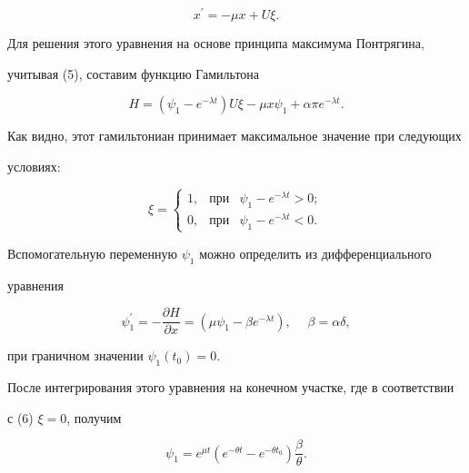 \[

x^\prime=-\mu x +U\xi. 

\]



Для решения этого уравнения на основе принципа максимума Понтрягина, 

учитывая (5), составим функцию Гамильтона



\[

H=(\psi_1-e^{-\lambda t})U\xi-\mu x \psi_1+\alpha\pi e^{-\lambda t}.

\]



Как видно, этот гамильтониан принимает максимальное значение при следующих 

условиях:

\begin{equation}

\label{f6}

\xi=\left \{ \begin{array}{ccc}

1, & \text{при} & \psi_1-e^{-\lambda t} > 0; \\

0, & \text{при} & \psi_1-e^{-\lambda t} < 0.   

\end{array}

\right. 

\end{equation}



Вспомогательную переменную $\psi_1$ можно определить из дифференциального 

уравнения

\[

\psi_1^\prime=-\frac{\partial H}{\partial x}=(\mu\psi_1-\beta e^{-\lambda t}),  \quad \; \beta=\alpha\delta,

\]



\noindent при граничном значении $\psi_1(t_0)=0$.

       

После интегрирования этого уравнения на конечном участке, где в соответствии 

с (6) $\xi=0$, получим

\[

\psi_1=e^{\mu t}(e^{-\theta t}-e^{-\theta t_0})\frac{\beta}{\theta}.

\]



